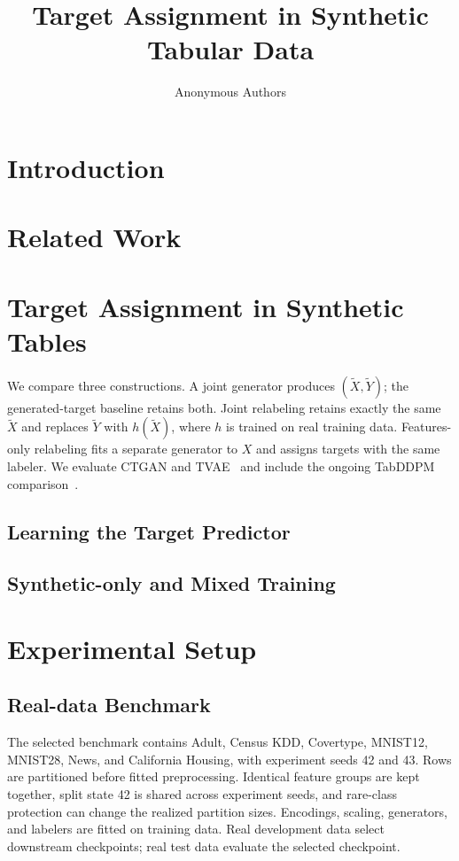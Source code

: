 \documentclass[letterpaper]{article}
\title{Target Assignment in Synthetic Tabular Data}
\author{Anonymous Authors}
\begin{document}
\maketitle
\begin{abstract}
\end{abstract}

\section{Introduction}
\section{Related Work}

\section{Target Assignment in Synthetic Tables}
We compare three constructions. A joint generator produces $(\widetilde X,
\widetilde Y)$; the generated-target baseline retains both. Joint relabeling
retains exactly the same $\widetilde X$ and replaces $\widetilde Y$ with
$h(\widetilde X)$, where $h$ is trained on real training data. Features-only
relabeling fits a separate generator to $X$ and assigns targets with the
same labeler. We evaluate CTGAN and TVAE~\citep{xu2019ctgan} and include
the ongoing TabDDPM comparison~\citep{kotelnikov2023tabddpm}.
\subsection{Learning the Target Predictor}
\subsection{Synthetic-only and Mixed Training}

\section{Experimental Setup}
\subsection{Real-data Benchmark}
The selected benchmark contains Adult, Census KDD, Covertype, MNIST12,
MNIST28, News, and California Housing, with experiment seeds 42 and 43.
Rows are partitioned before fitted preprocessing. Identical feature groups
are kept together, split state 42 is shared across experiment seeds, and
rare-class protection can change the realized partition sizes. Encodings,
scaling, generators, and labelers are fitted on training data. Real
development data select downstream checkpoints; real test data evaluate
the selected checkpoint.
\end{document}
